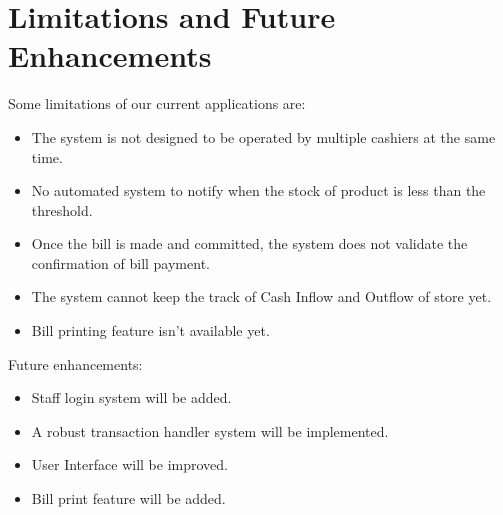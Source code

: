 \section{Limitations and Future Enhancements}

Some limitations of our current applications are:
\begin{itemize}[topsep=0pt]
  \item The system is not designed to be operated by multiple cashiers at the
    same time.
  \item No automated system to notify when the stock of product is less than
    the threshold.
  \item Once the bill is made and committed, the system does not validate the
    confirmation of bill payment.
  \item The system cannot keep the track of Cash Inflow and Outflow of store
    yet.
  \item Bill printing feature isn't available yet.
\end{itemize}

Future enhancements:
\begin{itemize}[topsep=0pt]
  \item Staff login system will be added.
  \item A robust transaction handler system will be implemented.
  \item User Interface will be improved.
  \item Bill print feature will be added.
\end{itemize}

